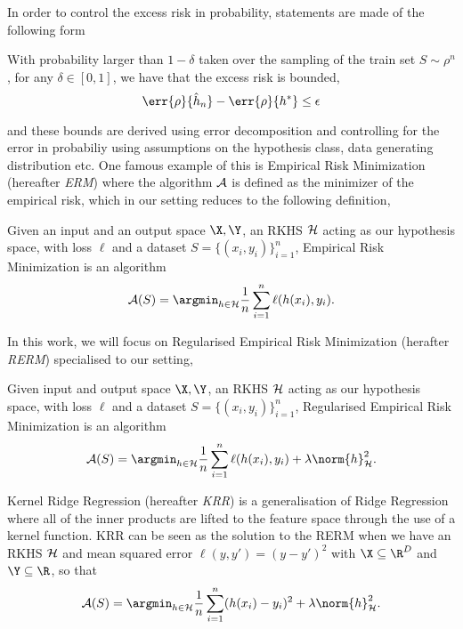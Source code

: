 In order to control the excess risk in probability, statements are made of the
following form
\begin{example}
  \label{ex:pac-like-excess-risk} With probability larger than \(1 - \delta\)
taken over the sampling of the train set \(S \sim \rho^n\), for any \(\delta \in
[0, 1]\), we have that the excess risk is bounded,
  \begin{equation*} \err{\rho}{\hat{h}_n} - \err{\rho}{h^{\ast}} \leq \epsilon
  \end{equation*}
\end{example} and these bounds are derived using error decomposition and
controlling for the error in probabiliy using assumptions on the hypothesis
class, data generating distribution etc. One famous example of this is Empirical
Risk Minimization (hereafter \emph{ERM})\citep{vapnik92_princ} where the
algorithm \(\mathcal{A}\) is defined as the minimizer of the empirical risk, which in
our setting reduces to the following definition,
\begin{definition}
  \label{def:erm} Given an input and an output space \(\X, \Y\), an RKHS
\(\mathcal{H}\) acting as our hypothesis space, with loss \(\ell\) and a dataset
\(S = \{(x_i, y_i)\}_{i=1}^n\), Empirical Risk Minimization is an algorithm
  \begin{equation*} \algo(S) = \argmin_{h \in \mathcal{H}} \frac{1}{n}
\sum_{i=1}^n \ell(h(x_i), y_i).
  \end{equation*}
\end{definition} In this work, we will focus on Regularised Empirical Risk
Minimization (herafter \emph{RERM}) specialised to our setting,
\begin{definition}
  \label{def:rerm} Given input and output space \(\X, \Y\), an RKHS \(\mathcal{H}\)
acting as our hypothesis space, with loss \(\ell\) and a dataset \(S = \{(x_i,
y_i)\}_{i=1}^n\), Regularised Empirical Risk Minimization is an algorithm
  \begin{equation*} \algo(S) = \argmin_{h \in \mathcal{H}} \frac{1}{n}
\sum_{i=1}^n \ell(h(x_i), y_i) + \lambda \norm{h}_{\rkhs{H}}^2.
  \end{equation*}
\end{definition}

Kernel Ridge Regression (hereafter \emph{KRR}) is a generalisation of Ridge
Regression \citep{hoerl70_ridge_regres} where all of the inner products are
lifted to the feature space through the use of a kernel function. KRR can be
seen as the solution to the RERM when we have an RKHS \(\mathcal{H}\) and mean
squared error \(\ell(y, y') = (y - y')^{2}\) with \(\X \subseteq \R^{D}\) and
\(\Y \subseteq \R\), so that
\begin{equation*}
  \label{eq:krr-rerm-form} \algo(S) = \argmin_{h \in \mathcal{H}}
\frac{1}{n}\sum_{i=1}^n (h(x_i) - y_i)^2 + \lambda \norm{h}_{\rkhs{H}}^2.
\end{equation*}

